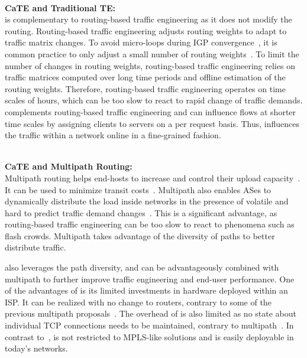 \ \\\noindent\textbf{CaTE and Traditional TE:}\label{sec:CaTE-TE}\\\noindent
\cate is complementary to routing-based traffic engineering as it does not
modify the routing. Routing-based traffic engineering adjusts routing weights
to adapt to traffic matrix changes. To avoid micro-loops during IGP
convergence~\cite{transient-IGP}, it is common practice to only adjust a small
number of routing weights~\cite{FT01}. To limit the number of changes in
routing weights, routing-based traffic engineering relies on traffic matrices
computed over long time periods and offline estimation of the routing weights.
Therefore, routing-based traffic engineering operates on time scales of hours,
which can be too slow to react to rapid change of traffic demands.  \cate
complements routing-based traffic engineering and can influence flows at
shorter time scales by assigning clients to servers on a per request
basis. Thus, \cate influences the traffic within a network online in a
fine-grained fashion.


\ \\\noindent\textbf{CaTE and Multipath Routing:}\label{sec:CaTE-Multipath}\\\noindent
Multipath routing helps end-hosts to increase and control their upload
capacity~\cite{PathSelection:CACM2011}. It can be used to minimize transit
costs~\cite{Optimizing:Goldenberg2004}. Multipath also enables ASes to
dynamically distribute the load inside networks in the presence of volatile and
hard to predict traffic demand
changes~\cite{TrafficDemand:ToN2001,MATE2001,TeXCP,Replex}.  This is a
significant advantage, as routing-based traffic engineering can be too slow to
react to phenomena such as flash crowds. Multipath takes advantage of the
diversity of paths to better distribute traffic.

\cate also leverages the path diversity, and can be advantageously combined
with multipath to further improve traffic engineering and end-user
performance. One of the advantages of \cate is its limited investments in
hardware deployed within an ISP. It can be realized with no change to routers,
contrary to some of the previous multipath
proposals~\cite{TeXCP,MATE2001,Replex}.  The overhead of \cate is also limited
as no state about individual TCP connections needs to be maintained, contrary
to multipath~\cite{TeXCP,MATE2001,Replex}.  In contrast
to~\cite{MATE2001,TeXCP}, \cate is not restricted to MPLS-like solutions and is
easily deployable in today's networks.


